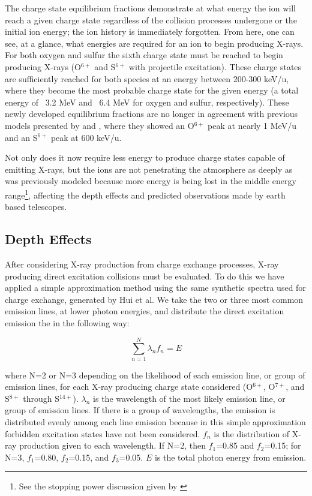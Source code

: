 \documentclass[draft]{agujournal2018}
\begin{document}
The charge state equilibrium fractions demonstrate at what energy the ion will reach a given charge state regardless of the collision processes undergone or the initial ion energy; the ion history is immediately forgotten.
From here, one can see, at a glance, what energies are required for an ion to begin producing X-rays.
For both oxygen and sulfur the sixth charge state must be reached to begin producing X-rays (O$^{6+}$ and S$^{6+}$ with projectile excitation).
These charge states are sufficiently reached for both species at an energy between 200-300 keV/u, where they become the most probable charge state for the given energy (a total energy of ~3.2 MeV and ~6.4 MeV for oxygen and sulfur, respectively).
These newly developed equilibrium fractions are no longer in agreement with previous models presented by \citet{ozak2010} and \citet{houston2018}, where they showed an O$^{6+}$ peak at nearly 1 MeV/u and an S$^{6+}$ peak at 600 keV/u.

Not only does it now require less energy to produce charge states capable of emitting X-rays, but the ions are not penetrating the atmosphere as deeply as was previously modeled because more energy is being lost in the middle energy range\footnote{See the stopping power discussion given by \citet{schultz2018}}, affecting the depth effects and predicted observations made by earth based telescopes.


\subsection{Depth Effects}

After considering X-ray production from charge exchange processes, X-ray producing direct excitation collisions must be evaluated.
To do this we have applied a simple approximation method using the same synthetic spectra used for charge exchange, generated by Hui et al.
We take the two or three most common emission lines, at lower photon energies, and distribute the direct excitation emission the in the following way:

\begin{equation}
    \sum_{n=1}^{N}\lambda_{n}f_{n}=E
    \label{eqn:DEemission}
\end{equation}

\noindent where N=2 or N=3 depending on the likelihood of each emission line, or group of emission lines, for each X-ray producing charge state considered (O$^{6+}$, O$^{7+}$, and S$^{8+}$ through S$^{14+}$).
$\lambda_{n}$ is the wavelength of the most likely emission line, or group of emission lines.
If there is a group of wavelengths, the emission is distributed evenly among each line emission because in this simple approximation forbidden excitation states have not been considered.
$f_{n}$ is the distribution of X-ray production given to each wavelength.
If N=2, then $f_{1}$=0.85 and $f_{2}$=0.15; for N=3, $f_{1}$=0.80, $f_{2}$=0.15, and $f_{3}$=0.05.
$E$ is the total photon energy from emission.
\end{document}
